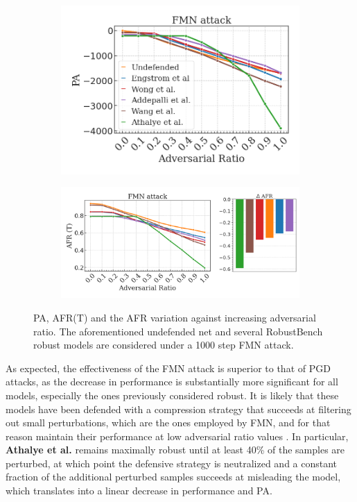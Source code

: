\begin{figure}[H]
    \centering
    \begin{subfigure}[b]{0.39\textwidth}
        \centering
        \includegraphics[width=\textwidth]{img/results_discussion/adversarial/FMN_logPA.png}
    \end{subfigure}
    \hfill
    \begin{subfigure}[b]{0.59\textwidth}
        \centering
        \includegraphics[width=\textwidth]{img/results_discussion/adversarial/FMN_1000_AFR_true.png}
    \end{subfigure}
    \caption{PA, AFR(T) and the AFR variation against increasing adversarial ratio. 
    The aforementioned undefended net and several RobustBench robust models are considered 
    under a 1000 step FMN attack.}
    \label{fig:adv_fmn_pa_afr}
\end{figure}


As expected, the effectiveness of the FMN attack is superior to that of PGD attacks, as
the decrease in performance is substantially more significant for all models, especially the ones
previously considered robust. It is likely that these models have been defended with a
compression strategy that succeeds at filtering out small perturbations, which are
the ones employed by FMN, and for that reason maintain their performance at low
adversarial ratio values \cite{dasKeepingBadGuys2017}.
In particular, {\color{tab:green} \textbf{Athalye et al.}} remains maximally robust
until at least 40\% of the samples are perturbed, at which point the defensive strategy
is neutralized and a constant fraction of the additional perturbed samples succeeds at
misleading the model, which translates into a linear decrease in performance and PA. \\

